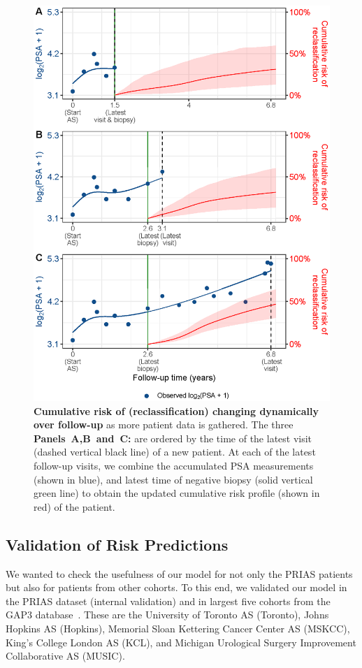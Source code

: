 \begin{figure}
\centerline{\includegraphics[width=\columnwidth]{images/dynrisk_plot_102.eps}}
\caption{\textbf{Cumulative risk of (reclassification) changing dynamically over follow-up} as more patient data is gathered. The three \textbf{Panels~A,B~and~C:} are ordered by the time of the latest visit (dashed vertical black line) of a new patient. At each of the latest follow-up visits, we combine the accumulated PSA measurements (shown in blue), and latest time of negative biopsy (solid vertical green line) to obtain the updated cumulative risk profile (shown in red) of the patient.}
\label{fig:dynrisk_plot_102}
\end{figure}

\clearpage
\subsection{Validation of Risk Predictions}
We wanted to check the usefulness of our model for not only the PRIAS patients but also for patients from other cohorts. To this end, we validated our model in the PRIAS dataset (internal validation) and in largest five cohorts from the GAP3 database~\citep{gap3_2018}. These are the University of Toronto AS (Toronto), Johns Hopkins AS (Hopkins), Memorial Sloan Kettering Cancer Center AS (MSKCC), King's College London AS (KCL), and Michigan Urological Surgery Improvement Collaborative AS (MUSIC).

